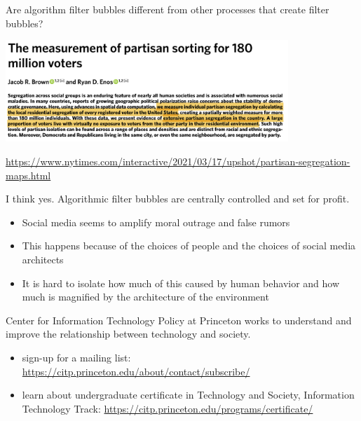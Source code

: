\documentclass[aspectratio=169]{beamer}
\begin{document}
\begin{frame}

Are algorithm filter bubbles different from other processes that create filter bubbles? \pause

\begin{center}
\includegraphics[width=0.80\textwidth]{figures/brown_measurement_2021_titleaabstract}
\end{center}

{\tiny \url{https://www.nytimes.com/interactive/2021/03/17/upshot/partisan-segregation-maps.html}}
\pause

\vfill
I think yes. Algorithmic filter bubbles are centrally controlled and set for profit.

\end{frame}
\begin{frame}

\begin{itemize}
\item Social media seems to amplify moral outrage and false rumors \pause
\item This happens because of the choices of people and the choices of social media architects \pause
\item It is hard to isolate how much of this caused by human behavior and how much is magnified by the architecture of the environment
\end{itemize}

\end{frame}
\begin{frame}

Center for Information Technology Policy at Princeton works to understand and improve the relationship between technology and society.
\begin{itemize}
\item sign-up for a mailing list: \url{https://citp.princeton.edu/about/contact/subscribe/}
\item learn about undergraduate certificate in Technology and Society, Information Technology Track: \url{https://citp.princeton.edu/programs/certificate/}
\end{itemize}

\end{frame}
\end{document}
